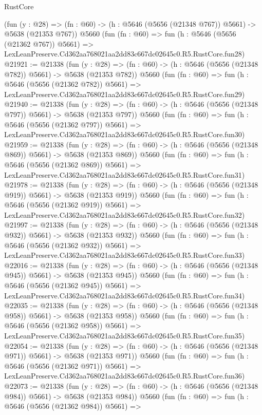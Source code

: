 \begin{lexlean}{RustCore}
\begin{coremodule}
    (fun (y : @28) => (fn : @60) -> (h : @5646 (@5656 (@21348 @767)) @5661) -> @5638 (@21353 @767))
    @5660
    (fun (fn : @60) =>
    fun (h : @5646 (@5656 (@21362 @767)) @5661) =>
    LexLeanPreserve.Cd362aa768021aa2dd83c667dc02645c0.R5.RustCore.fun28)
@21921 := @21338
    (fun (y : @28) => (fn : @60) -> (h : @5646 (@5656 (@21348 @782)) @5661) -> @5638 (@21353 @782))
    @5660
    (fun (fn : @60) =>
    fun (h : @5646 (@5656 (@21362 @782)) @5661) =>
    LexLeanPreserve.Cd362aa768021aa2dd83c667dc02645c0.R5.RustCore.fun29)
@21940 := @21338
    (fun (y : @28) => (fn : @60) -> (h : @5646 (@5656 (@21348 @797)) @5661) -> @5638 (@21353 @797))
    @5660
    (fun (fn : @60) =>
    fun (h : @5646 (@5656 (@21362 @797)) @5661) =>
    LexLeanPreserve.Cd362aa768021aa2dd83c667dc02645c0.R5.RustCore.fun30)
@21959 := @21338
    (fun (y : @28) => (fn : @60) -> (h : @5646 (@5656 (@21348 @869)) @5661) -> @5638 (@21353 @869))
    @5660
    (fun (fn : @60) =>
    fun (h : @5646 (@5656 (@21362 @869)) @5661) =>
    LexLeanPreserve.Cd362aa768021aa2dd83c667dc02645c0.R5.RustCore.fun31)
@21978 := @21338
    (fun (y : @28) => (fn : @60) -> (h : @5646 (@5656 (@21348 @919)) @5661) -> @5638 (@21353 @919))
    @5660
    (fun (fn : @60) =>
    fun (h : @5646 (@5656 (@21362 @919)) @5661) =>
    LexLeanPreserve.Cd362aa768021aa2dd83c667dc02645c0.R5.RustCore.fun32)
@21997 := @21338
    (fun (y : @28) => (fn : @60) -> (h : @5646 (@5656 (@21348 @932)) @5661) -> @5638 (@21353 @932))
    @5660
    (fun (fn : @60) =>
    fun (h : @5646 (@5656 (@21362 @932)) @5661) =>
    LexLeanPreserve.Cd362aa768021aa2dd83c667dc02645c0.R5.RustCore.fun33)
@22016 := @21338
    (fun (y : @28) => (fn : @60) -> (h : @5646 (@5656 (@21348 @945)) @5661) -> @5638 (@21353 @945))
    @5660
    (fun (fn : @60) =>
    fun (h : @5646 (@5656 (@21362 @945)) @5661) =>
    LexLeanPreserve.Cd362aa768021aa2dd83c667dc02645c0.R5.RustCore.fun34)
@22035 := @21338
    (fun (y : @28) => (fn : @60) -> (h : @5646 (@5656 (@21348 @958)) @5661) -> @5638 (@21353 @958))
    @5660
    (fun (fn : @60) =>
    fun (h : @5646 (@5656 (@21362 @958)) @5661) =>
    LexLeanPreserve.Cd362aa768021aa2dd83c667dc02645c0.R5.RustCore.fun35)
@22054 := @21338
    (fun (y : @28) => (fn : @60) -> (h : @5646 (@5656 (@21348 @971)) @5661) -> @5638 (@21353 @971))
    @5660
    (fun (fn : @60) =>
    fun (h : @5646 (@5656 (@21362 @971)) @5661) =>
    LexLeanPreserve.Cd362aa768021aa2dd83c667dc02645c0.R5.RustCore.fun36)
@22073 := @21338
    (fun (y : @28) => (fn : @60) -> (h : @5646 (@5656 (@21348 @984)) @5661) -> @5638 (@21353 @984))
    @5660
    (fun (fn : @60) =>
    fun (h : @5646 (@5656 (@21362 @984)) @5661) =>

\end{coremodule}
\end{lexlean}
